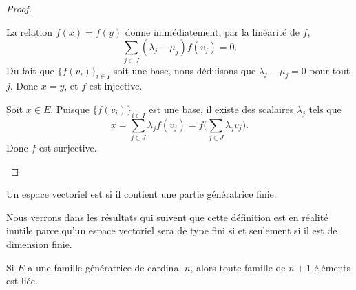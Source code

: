 \begin{proof}
\begin{subproof}
\begin{subproof}
			La relation \( f(x)=f(y)\) donne immédiatement, par la linéarité de \( f\),
			\begin{equation}
				\sum_{j\in J}(\lambda_j-\mu_j)f(v_j)=0.
			\end{equation}
			Du fait que \( \{ f(v_i) \}_{i\in I}\) soit une base, nous déduisons que \( \lambda_j-\mu_j=0\) pour tout \( j\). Donc \( x=y\), et \( f\) est injective.

			\spitem[Surjective]
			Soit \( x\in E\). Puisque \( \{ f(v_i) \}_{i\in I}\) est une base, il existe des scalaires \( \lambda_j\) tels que
			\begin{equation}
				x=\sum_{j\in J}\lambda_jf(v_j)=f\big( \sum_{j\in J}\lambda_jv_j \big).
			\end{equation}
			Donc \( f\) est surjective.
		\end{subproof}
	\end{subproof}
\end{proof}

\begin{definition}
	Un espace vectoriel est  si il contient une partie génératrice finie.
\end{definition}
Nous verrons dans les résultats qui suivent que cette définition est en réalité inutile parce qu'un espace vectoriel sera de type fini si et seulement si il est de dimension finie.

\begin{lemma}       \label{LemytHnlD}
	Si \( E\) a une famille génératrice de cardinal \( n\), alors toute famille de \( n+1\) éléments est liée.
\end{lemma}

